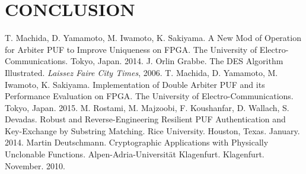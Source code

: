 \documentclass[letterpaper, 10 pt, conference]{ieeeconf}  %
\begin{document}
\section{CONCLUSION}


\addtolength{\textheight}{-12cm}   %















\begin{thebibliography}{99}

 T. Machida, D. Yamamoto, M. Iwamoto, K. Sakiyama. A New Mod of Operation for Arbiter PUF to Improve Uniqueness on FPGA. The University of Electro-Communications. Tokyo, Japan. 2014.
 J. Orlin Grabbe. The DES Algorithm Illustrated. \emph{Laissez Faire City Times}, 2006.
 T. Machida, D. Yamamoto, M. Iwamoto, K. Sakiyama. Implementation of Double Arbiter PUF and its Performance Evaluation on FPGA. The University of Electro-Communications. Tokyo, Japan. 2015.
 M. Rostami, M. Majzoobi, F. Koushanfar, D. Wallach, S. Devadas. Robust and Reverse-Engineering Resilient PUF Authentication and Key-Exchange by Substring Matching. Rice University. Houston, Texas. January. 2014.
 Martin Deutschmann. Cryptographic Applications with Physically Unclonable Functions. Alpen-Adria-Universit{\"a}t Klagenfurt. Klagenfurt. November. 2010.

\end{thebibliography}
\end{document}
